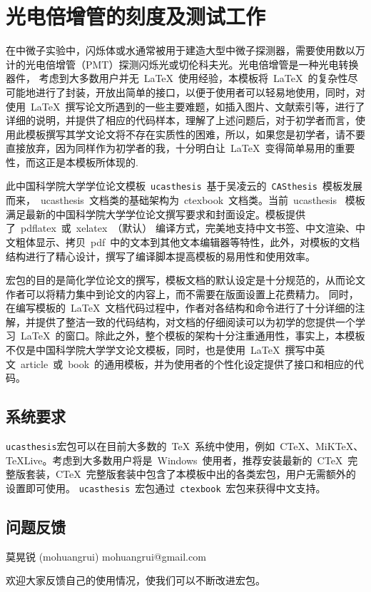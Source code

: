 
\chapter{光电倍增管的刻度及测试工作}
\label{chap:chap3}
在中微子实验中，闪烁体或水通常被用于建造大型中微子探测器，需要使用数以万计的光电倍增管（PMT）探测闪烁光或切伦科夫光。光电倍增管是一种光电转换器件，
考虑到大多数用户并无~\LaTeX{}~使用经验，本模板将~\LaTeX{}~的复杂性尽可能地进行了封装，开放出简单的接口，以便于使用者可以轻易地使用，同时，对使用~\LaTeX{}~撰写论文所遇到的一些主要难题，如插入图片、文献索引等，进行了详细的说明，并提供了相应的代码样本，理解了上述问题后，对于初学者而言，使用此模板撰写其学文论文将不存在实质性的困难，所以，如果您是初学者，请不要直接放弃，因为同样作为初学者的我，十分明白让~\LaTeX{}~变得简单易用的重要性，而这正是本模板所体现的.

此中国科学院大学学位论文模板~\texttt{ucasthesis}~基于吴凌云的~\texttt{CASthesis}~模板发展而来，~ucasthesis~文档类的基础架构为~ctexbook~文档类。当前~ucasthesis~ 模板满足最新的中国科学院大学学位论文撰写要求和封面设定。模板提供了~pdflatex~或~xelatex~（默认） 编译方式，完美地支持中文书签、中文渲染、中文粗体显示、拷贝~pdf~中的文本到其他文本编辑器等特性，此外，对模板的文档结构进行了精心设计，撰写了编译脚本提高模板的易用性和使用效率。

宏包的目的是简化学位论文的撰写，模板文档的默认设定是十分规范的，从而论文作者可以将精力集中到论文的内容上，而不需要在版面设置上花费精力。 同时，在编写模板的~\LaTeX{}~文档代码过程中，作者对各结构和命令进行了十分详细的注解，并提供了整洁一致的代码结构，对文档的仔细阅读可以为初学的您提供一个学习~\LaTeX{}~的窗口。除此之外，整个模板的架构十分注重通用性，事实上，本模板不仅是中国科学院大学学文论文模板，同时，也是使用~\LaTeX{}~撰写中英文~article~或~book~的通用模板，并为使用者的个性化设定提供了接口和相应的代码。

\section{系统要求}

\texttt{ucasthesis}宏包可以在目前大多数的~\TeX{}~系统中使用，例如~C\TeX{}、MiK\TeX{}、\TeX{}Live。考虑到大多数用户将是~Windows~使用者，推荐安装最新的~C\TeX{}~完整版套装，C\TeX{}~完整版套装中包含了本模板中出的各类宏包，用户无需额外的设置即可使用。 \texttt{ucasthesis}~宏包通过~\texttt{ctexbook}~宏包来获得中文支持。

\section{问题反馈}

\begin{center}
莫晃锐 (mohuangrui) \quad mohuangrui@gmail.com
\end{center}

欢迎大家反馈自己的使用情况，使我们可以不断改进宏包。
